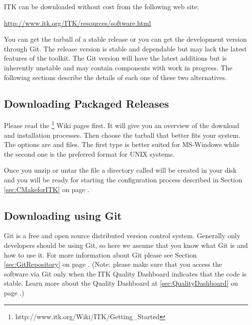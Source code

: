 
ITK can be downloaded without cost from the following web site:
\begin{center}
  \url{http://www.itk.org/ITK/resources/software.html}
\end{center}

You can get the tarball of a stable release or you can get the
development version through Git.  The release version is stable and
dependable but may lack the latest features of the toolkit. The Git
version will have the latest additions but is inherently unstable and
may contain components with work in progress.  The following sections
describe the details of each one of these two alternatives.

\subsection{Downloading Packaged Releases}
\label{sec:DownloadingReleases}


Please read the
\footnote{http://www.itk.org/Wiki/ITK/Getting\_Started}
Wiki pages first. It will give you an overview of the download and installation
processes. Then choose the tarball that better fits your system. The options
are  and  files.  The first type is better suited for
MS-Windows while the second one is the preferred format for UNIX systems.

Once you unzip or untar the file a directory called  will be
created in your disk and you will be ready for starting the configuration
process described in Section \ref{sec:CMakeforITK} on page
\pageref{sec:CMakeforITK}.

\subsection{Downloading using Git}
\label{sec:DownloadingFromGit}


Git is a free and open source distributed version control system.
Generally only developers should be using Git, so here we
assume that you know what Git is and how to use it.  For more information
about Git please see Section \ref{sec:GitRepository} on page
\pageref{sec:GitRepository}. (Note: please make sure that you access the
software via Git only when the ITK Quality Dashboard indicates that the
code is stable. Learn more about the Quality Dashboard at
\ref{sec:QualityDashboard} on page \pageref{sec:QualityDashboard}.)

